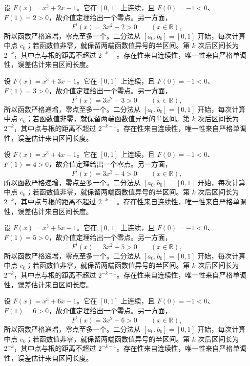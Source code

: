 \documentclass[12pt,fontset=fandol]{ctexart}
\begin{document}
\begin{solve}\label{ans:c6q8}
设 $F(x)=x^3+2x-1$。它在 $[0,1]$ 上连续，且 $F(0)=-1<0$、$F(1)=2>0$，故介值定理给出一个零点。另一方面，
\[
F^{\prime}(x)=3x^2+2>0\qquad(x\in\mathbb R),
\]
所以函数严格递增，零点至多一个。二分法从 $[a_0,b_0]=[0,1]$ 开始，每次计算中点 $c_k$；若函数值非零，就保留两端函数值异号的半区间。第 $k$ 次后区间长为 $2^{-k}$，其中点与根的距离不超过 $2^{-k-1}$。存在性来自连续性，唯一性来自严格单调性，误差估计来自区间长度。
\end{solve}

\begin{solve}\label{ans:c6q9}
设 $F(x)=x^3+3x-1$。它在 $[0,1]$ 上连续，且 $F(0)=-1<0$、$F(1)=3>0$，故介值定理给出一个零点。另一方面，
\[
F^{\prime}(x)=3x^2+3>0\qquad(x\in\mathbb R),
\]
所以函数严格递增，零点至多一个。二分法从 $[a_0,b_0]=[0,1]$ 开始，每次计算中点 $c_k$；若函数值非零，就保留两端函数值异号的半区间。第 $k$ 次后区间长为 $2^{-k}$，其中点与根的距离不超过 $2^{-k-1}$。存在性来自连续性，唯一性来自严格单调性，误差估计来自区间长度。
\end{solve}

\begin{solve}\label{ans:c6q10}
设 $F(x)=x^3+4x-1$。它在 $[0,1]$ 上连续，且 $F(0)=-1<0$、$F(1)=4>0$，故介值定理给出一个零点。另一方面，
\[
F^{\prime}(x)=3x^2+4>0\qquad(x\in\mathbb R),
\]
所以函数严格递增，零点至多一个。二分法从 $[a_0,b_0]=[0,1]$ 开始，每次计算中点 $c_k$；若函数值非零，就保留两端函数值异号的半区间。第 $k$ 次后区间长为 $2^{-k}$，其中点与根的距离不超过 $2^{-k-1}$。存在性来自连续性，唯一性来自严格单调性，误差估计来自区间长度。
\end{solve}

\begin{solve}\label{ans:c6q11}
设 $F(x)=x^3+5x-1$。它在 $[0,1]$ 上连续，且 $F(0)=-1<0$、$F(1)=5>0$，故介值定理给出一个零点。另一方面，
\[
F^{\prime}(x)=3x^2+5>0\qquad(x\in\mathbb R),
\]
所以函数严格递增，零点至多一个。二分法从 $[a_0,b_0]=[0,1]$ 开始，每次计算中点 $c_k$；若函数值非零，就保留两端函数值异号的半区间。第 $k$ 次后区间长为 $2^{-k}$，其中点与根的距离不超过 $2^{-k-1}$。存在性来自连续性，唯一性来自严格单调性，误差估计来自区间长度。
\end{solve}

\begin{solve}\label{ans:c6q12}
设 $F(x)=x^3+6x-1$。它在 $[0,1]$ 上连续，且 $F(0)=-1<0$、$F(1)=6>0$，故介值定理给出一个零点。另一方面，
\[
F^{\prime}(x)=3x^2+6>0\qquad(x\in\mathbb R),
\]
所以函数严格递增，零点至多一个。二分法从 $[a_0,b_0]=[0,1]$ 开始，每次计算中点 $c_k$；若函数值非零，就保留两端函数值异号的半区间。第 $k$ 次后区间长为 $2^{-k}$，其中点与根的距离不超过 $2^{-k-1}$。存在性来自连续性，唯一性来自严格单调性，误差估计来自区间长度。
\end{solve}
\end{document}
